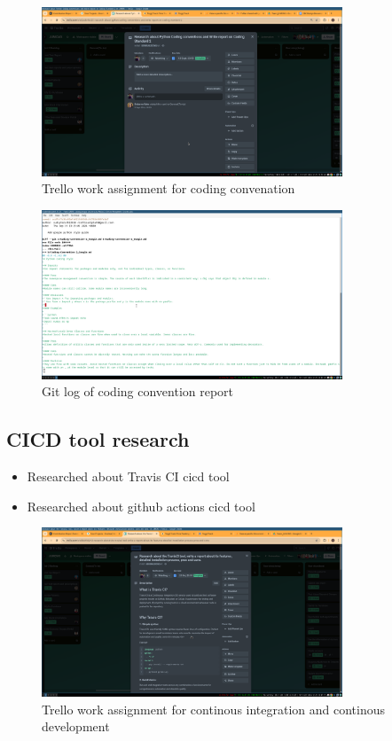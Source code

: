\documentclass[a4paper,12pt]{article}
\begin{document}
\begin{figure}[H]
    \centering
    \includegraphics[width=0.8\textwidth]{images/trello_coding_convention.png}
    \caption{Trello work assignment for coding convenation}
    \label{fig:trellocodingconventionreport}
\end{figure}


\begin{figure}[H]
    \centering
    \includegraphics[width=0.8\textwidth]{images/git_coding_convention.png}
    \caption{Git log of coding convention report}
    \label{fig:gitcodingconvention}
\end{figure}


\subsection{CICD tool research}
\begin{itemize}
    \item Researched about Travis CI cicd tool
    \item Researched about github actions cicd tool
\end{itemize}

\begin{figure}[H]
    \centering
    \includegraphics[width=0.8\textwidth]{images/trello_cicd.png}
    \caption{Trello work assignment for continous integration and continous development}
    \label{fig:trellocicd}
\end{figure}
\end{document}
